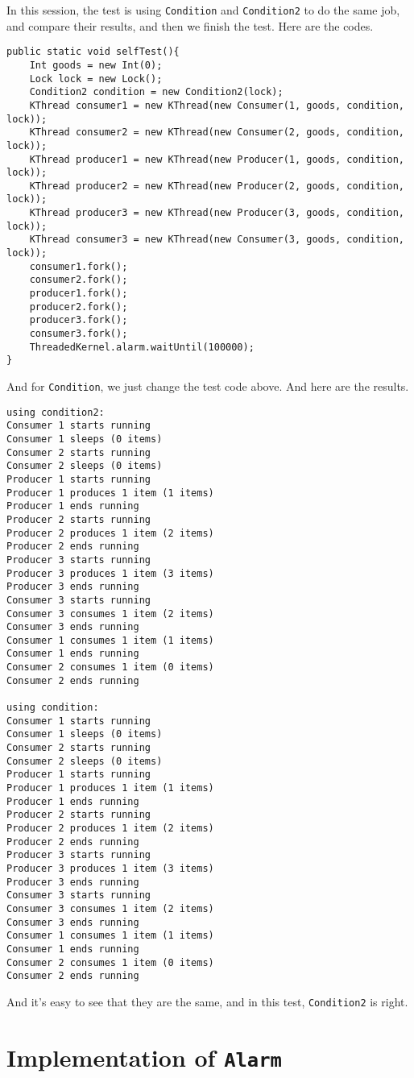 \documentclass{article}
\begin{document}
In this session, the test is using \texttt{Condition} and \texttt{Condition2} to do the same job, and compare their results, and then we finish the test. Here are the codes.
\begin{lstlisting}
public static void selfTest(){
	Int goods = new Int(0);
	Lock lock = new Lock();
	Condition2 condition = new Condition2(lock);
	KThread consumer1 = new KThread(new Consumer(1, goods, condition, lock));
	KThread consumer2 = new KThread(new Consumer(2, goods, condition, lock));
	KThread producer1 = new KThread(new Producer(1, goods, condition, lock));
	KThread producer2 = new KThread(new Producer(2, goods, condition, lock));
	KThread producer3 = new KThread(new Producer(3, goods, condition, lock));
	KThread consumer3 = new KThread(new Consumer(3, goods, condition, lock));
	consumer1.fork();
	consumer2.fork();
	producer1.fork();
	producer2.fork();
	producer3.fork();
	consumer3.fork();
	ThreadedKernel.alarm.waitUntil(100000);
}
\end{lstlisting}
And for \texttt{Condition}, we just change the test code above. And here are the results.
\begin{lstlisting}
using condition2:
Consumer 1 starts running
Consumer 1 sleeps (0 items)
Consumer 2 starts running
Consumer 2 sleeps (0 items)
Producer 1 starts running
Producer 1 produces 1 item (1 items)
Producer 1 ends running
Producer 2 starts running
Producer 2 produces 1 item (2 items)
Producer 2 ends running
Producer 3 starts running
Producer 3 produces 1 item (3 items)
Producer 3 ends running
Consumer 3 starts running
Consumer 3 consumes 1 item (2 items)
Consumer 3 ends running
Consumer 1 consumes 1 item (1 items)
Consumer 1 ends running
Consumer 2 consumes 1 item (0 items)
Consumer 2 ends running

using condition:
Consumer 1 starts running
Consumer 1 sleeps (0 items)
Consumer 2 starts running
Consumer 2 sleeps (0 items)
Producer 1 starts running
Producer 1 produces 1 item (1 items)
Producer 1 ends running
Producer 2 starts running
Producer 2 produces 1 item (2 items)
Producer 2 ends running
Producer 3 starts running
Producer 3 produces 1 item (3 items)
Producer 3 ends running
Consumer 3 starts running
Consumer 3 consumes 1 item (2 items)
Consumer 3 ends running
Consumer 1 consumes 1 item (1 items)
Consumer 1 ends running
Consumer 2 consumes 1 item (0 items)
Consumer 2 ends running
\end{lstlisting}
And it's easy to see that they are the same, and in this test, \texttt{Condition2} is right.
\section{Implementation of \texttt{Alarm}}
\end{document}
